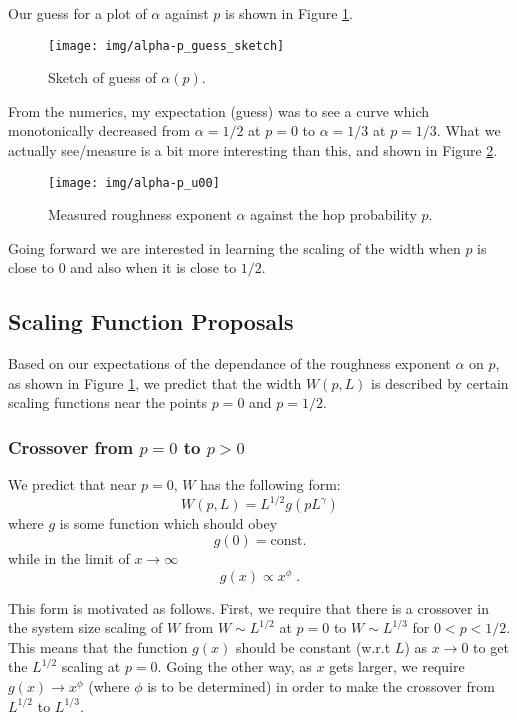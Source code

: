 \documentclass[a4paper,10pt]{article}
\newcommand{\fref}[1]{Figure \ref{#1}}
\begin{document}
Our guess for a plot of $\alpha$ against $p$ is shown in \fref{fig:alpha-p_guess_sketch}.
\begin{figure}[h!]
 \centering
 \texttt{[image: img/alpha-p\_guess\_sketch]}
 \caption{Sketch of guess of $\alpha(p)$.}
 \label{fig:alpha-p_guess_sketch}
\end{figure}
From the numerics, my expectation (guess) was to see a curve which monotonically decreased from $\alpha = 1/2$ at $p=0$ to $\alpha = 1/3$ at $p = 1/3$. What we actually see/measure is a bit more interesting than this, and shown in \fref{fig:alpha-p_u00}. 
\begin{figure}[bh!]
 \centering
 \texttt{[image: img/alpha-p\_u00]}
 \caption{Measured roughness exponent $\alpha$ against the hop probability $p$.}
 \label{fig:alpha-p_u00}
\end{figure}

Going forward we are interested in learning the scaling of the width when $p$ is close to $0$ and also when it is close to $1/2$.

\subsection{Scaling Function Proposals}

Based on our expectations of the dependance of the roughness exponent $\alpha$ on $p$, as shown in \fref{fig:alpha-p_guess_sketch}, we predict that the width $W(p,L)$ is described by certain scaling functions near the points $p=0$ and $p=1/2$.

\subsubsection{Crossover from $p=0$ to $p>0$}

We predict that near $p=0$, $W$ has the following form:
\begin{equation}
  W(p,L) = L^{1/2} g(pL^\gamma)
\end{equation}
where $g$ is some function which should obey
\begin{equation}
  g(0)= \mbox{const.}
\end{equation}
while in the limit of $x \to \infty$
\begin{equation}
  g(x) \propto x^\phi \;.
\end{equation}

This form is motivated as follows. First, we require that there is a crossover in the system size scaling of $W$ from $W \sim L^{1/2}$ at $p=0$ to $W \sim L^{1/3}$ for $0<p<1/2$. This means that the function $g(x)$ should be constant (w.r.t $L$) as $x\to0$ to get the $L^{1/2}$ scaling at $p=0$. Going the other way, as $x$ gets larger, we require $g(x)\to x^\phi$ (where $\phi$ is to be determined) in order to make the crossover from $L^{1/2}$ to $L^{1/3}$.
\end{document}
